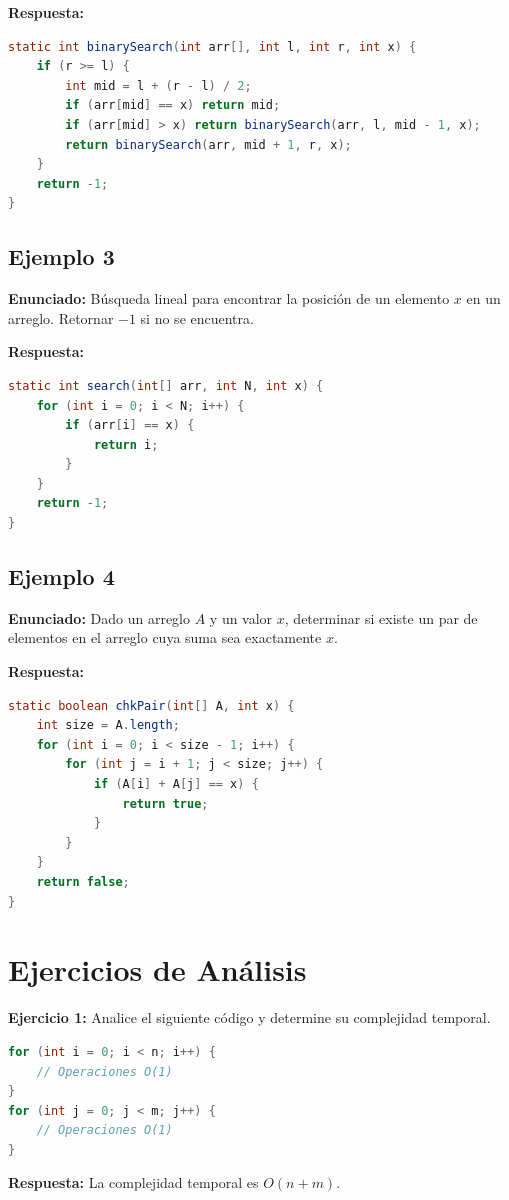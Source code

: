 \documentclass[11pt,a4paper]{article}
\begin{document}
\textbf{Respuesta:}
\begin{lstlisting}[language=Java]
static int binarySearch(int arr[], int l, int r, int x) {
    if (r >= l) {
        int mid = l + (r - l) / 2;
        if (arr[mid] == x) return mid;
        if (arr[mid] > x) return binarySearch(arr, l, mid - 1, x);
        return binarySearch(arr, mid + 1, r, x);
    }
    return -1;
}
\end{lstlisting}

\subsection*{Ejemplo 3}
\textbf{Enunciado:} Búsqueda lineal para encontrar la posición de un elemento $x$ en un arreglo. Retornar $-1$ si no se encuentra.

\textbf{Respuesta:}
\begin{lstlisting}[language=Java]
static int search(int[] arr, int N, int x) {
    for (int i = 0; i < N; i++) {
        if (arr[i] == x) {
            return i;
        }
    }
    return -1;
}
\end{lstlisting}

\subsection*{Ejemplo 4}
\textbf{Enunciado:} Dado un arreglo $A$ y un valor $x$, determinar si existe un par de elementos en el arreglo cuya suma sea exactamente $x$.

\textbf{Respuesta:}
\begin{lstlisting}[language=Java]
static boolean chkPair(int[] A, int x) {
    int size = A.length;
    for (int i = 0; i < size - 1; i++) {
        for (int j = i + 1; j < size; j++) {
            if (A[i] + A[j] == x) {
                return true;
            }
        }
    }
    return false;
}
\end{lstlisting}

\section*{Ejercicios de Análisis}

\textbf{Ejercicio 1:} Analice el siguiente código y determine su complejidad temporal.
\begin{lstlisting}[language=Java]
for (int i = 0; i < n; i++) {
    // Operaciones O(1)
}
for (int j = 0; j < m; j++) {
    // Operaciones O(1)
}
\end{lstlisting}
\textbf{Respuesta:} La complejidad temporal es $O(n + m)$.
\end{document}
